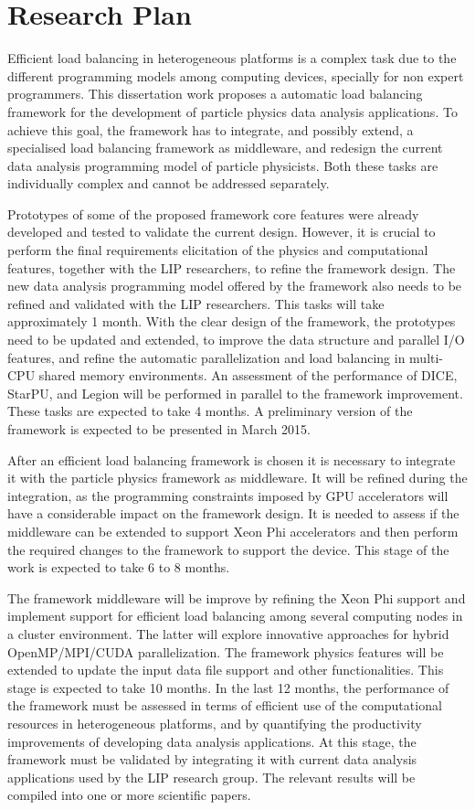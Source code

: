 \chapter{Research Plan}
\label{thesis_planning}

Efficient load balancing in heterogeneous platforms is a complex task due to the different programming models among computing devices, specially for non expert programmers. This dissertation work proposes a automatic load balancing framework for the development of particle physics data analysis applications. To achieve this goal, the framework has to integrate, and possibly extend, a specialised load balancing framework as middleware, and redesign the current data analysis programming model of particle physicists. Both these tasks are individually complex and cannot be addressed separately.

Prototypes of some of the proposed framework core features were already developed and tested to validate the current design. However, it is crucial to perform the final requirements elicitation of the physics and computational features, together with the LIP researchers, to refine the framework design. The new data analysis programming model offered by the framework also needs to be refined and validated with the LIP researchers. This tasks will take approximately 1 month. With the clear design of the framework, the prototypes need to be updated and extended, to improve the data structure and parallel I/O features, and refine the automatic parallelization and load balancing in multi-CPU shared memory environments. An assessment of the performance of DICE, StarPU, and Legion will be performed in parallel to the framework improvement. These tasks are expected to take 4 months. A preliminary version of the framework is expected to be presented in March 2015.

After an efficient load balancing framework is chosen it is necessary to integrate it with the particle physics framework as middleware. It will be refined during the integration, as the programming constraints imposed by GPU accelerators will have a considerable impact on the framework design. It is needed to assess if the middleware can be extended to support \intel Xeon Phi accelerators and then perform the required changes to the framework to support the device. This stage of the work is expected to take 6 to 8 months.

The framework middleware will be improve by refining the \intel Xeon Phi support and implement support for efficient load balancing among several computing nodes in a cluster environment. The latter will explore innovative approaches for hybrid OpenMP/MPI/CUDA parallelization. The framework physics features will be extended to update the input data file support and other functionalities. This stage is expected to take 10 months. In the last 12 months, the performance of the framework must be assessed in terms of efficient use of the computational resources in heterogeneous platforms, and by quantifying the productivity improvements of developing data analysis applications. At this stage, the framework must be validated by integrating it with current data analysis applications used by the LIP research group. The relevant results will be compiled into one or more scientific papers.
